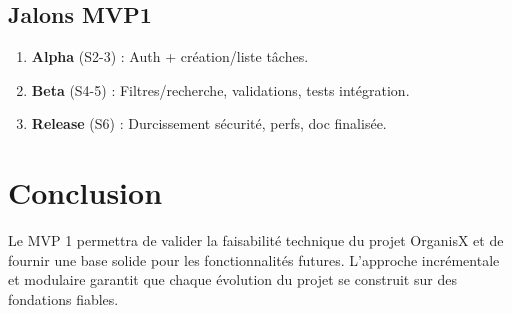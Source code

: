 \subsection{Jalons MVP1}
\begin{enumerate}
	\item \textbf{Alpha} (S2-3) : Auth + création/liste tâches.
	\item \textbf{Beta} (S4-5) : Filtres/recherche, validations, tests intégration.
	\item \textbf{Release} (S6) : Durcissement sécurité, perfs, doc finalisée.
\end{enumerate}

\section{Conclusion}
Le MVP 1 permettra de valider la faisabilité technique du projet OrganisX et de fournir une base solide pour les fonctionnalités futures. L’approche incrémentale et modulaire garantit que chaque évolution du projet se construit sur des fondations fiables.
